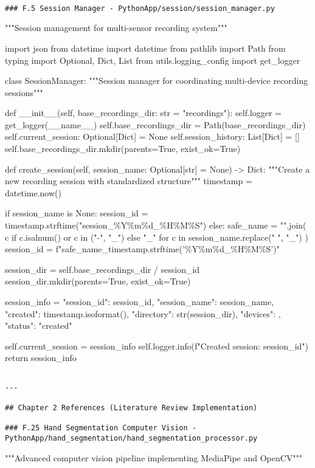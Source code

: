 \documentclass[12pt,a4paper]{report}
\begin{document}
\begin{verbatim}

### F.5 Session Manager - PythonApp/session/session_manager.py

\end{verbatim}
"""Session management for multi-sensor recording system"""

import json
from datetime import datetime
from pathlib import Path
from typing import Optional, Dict, List
from utils.logging\_config import get\_logger


class SessionManager:
    """Session manager for coordinating multi-device recording sessions"""

    def \_\_init\_\_(self, base\_recordings\_dir: str = "recordings"):
        self.logger = get\_logger(\_\_name\_\_)
        self.base\_recordings\_dir = Path(base\_recordings\_dir)
        self.current\_session: Optional[Dict] = None
        self.session\_history: List[Dict] = []
        self.base\_recordings\_dir.mkdir(parents=True, exist\_ok=True)

    def create\_session(self, session\_name: Optional[str] = None) -> Dict:
        """Create a new recording session with standardized structure"""
        timestamp = datetime.now()

        if session\_name is None:
            session\_id = timestamp.strftime("session\_\%Y\%m\%d\_\%H\%M\%S")
        else:
            safe\_name = "".join(
                c if c.isalnum() or c in ("-", "\_") else "\_"
                for c in session\_name.replace(" ", "\_")
            )
            session\_id = f"{safe\_name}\_{timestamp.strftime('\%Y\%m\%d\_\%H\%M\%S')}"

        session\_dir = self.base\_recordings\_dir / session\_id
        session\_dir.mkdir(parents=True, exist\_ok=True)

        session\_info = {
            "session\_id": session\_id,
            "session\_name": session\_name,
            "created": timestamp.isoformat(),
            "directory": str(session\_dir),
            "devices": {},
            "status": "created"
        }

        self.current\_session = session\_info
        self.logger.info(f"Created session: {session\_id}")
        return session\_info
\begin{verbatim}

---

## Chapter 2 References (Literature Review Implementation)

### F.25 Hand Segmentation Computer Vision - PythonApp/hand_segmentation/hand_segmentation_processor.py

\end{verbatim}
"""Advanced computer vision pipeline implementing MediaPipe and OpenCV"""
\end{document}
